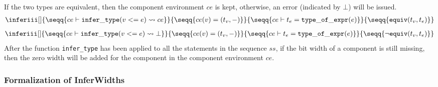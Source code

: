 {If the two types are equivalent, then the component environment $ce$ is kept, otherwise, an error (indicated by $\bot$) will be issued.
\begin{gather*}
    \inferiii[]
    {\seqq{ce \vdash {\tt infer\_type} (v<=e) \rightsquigarrow ce}}
    {\seqq{ce(v) = (t_v,-)}}
    {\seqq{ce \vdash t_e={\tt type\_of\_expr}(e)}} {\seqq{{\tt equiv}(t_v,t_e)}}
    \end{gather*}
\begin{gather*}
    \inferiii[]
    {\seqq{ce \vdash {\tt infer\_type} (v<=e) \rightsquigarrow \bot}}
    {\seqq{ce(v) = (t_v, -)}}
    {\seqq{ce \vdash t_e={\tt type\_of\_expr}(e)}} {\seqq{\neg{\tt equiv}(t_v,t_e)}}
    \end{gather*}
After the function {\tt infer\_type} has been applied to all the statements in the sequence $ss$, if the bit width of a component is still missing, then the zero width will be added for the component in
the component environment $ce$.
}


\subsubsection{Formalization of InferWidths}



